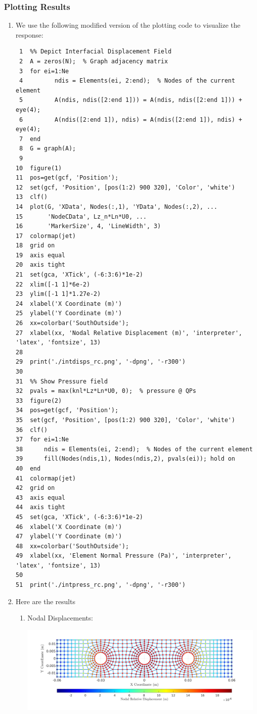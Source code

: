 \documentclass[11pt]{article}
\begin{document}
\subsubsection{Plotting Results}
\label{sec:org25cc1c0}
\begin{enumerate}
\item We use the following modified version of the plotting code to visualize the response:
\begin{verbatim}
 1  %% Depict Interfacial Displacement Field
 2  A = zeros(N);  % Graph adjacency matrix
 3  for ei=1:Ne
 4         ndis = Elements(ei, 2:end);  % Nodes of the current element
 5         A(ndis, ndis([2:end 1])) = A(ndis, ndis([2:end 1])) + eye(4);
 6         A(ndis([2:end 1]), ndis) = A(ndis([2:end 1]), ndis) + eye(4);
 7  end
 8  G = graph(A);
 9  
10  figure(1)
11  pos=get(gcf, 'Position');
12  set(gcf, 'Position', [pos(1:2) 900 320], 'Color', 'white')
13  clf()
14  plot(G, 'XData', Nodes(:,1), 'YData', Nodes(:,2), ...
15       'NodeCData', Lz_n*Ln*U0, ...
16       'MarkerSize', 4, 'LineWidth', 3)
17  colormap(jet)
18  grid on
19  axis equal
20  axis tight
21  set(gca, 'XTick', (-6:3:6)*1e-2)
22  xlim([-1 1]*6e-2)
23  ylim([-1 1]*1.27e-2)
24  xlabel('X Coordinate (m)')
25  ylabel('Y Coordinate (m)')
26  xx=colorbar('SouthOutside');
27  xlabel(xx, 'Nodal Relative Displacement (m)', 'interpreter', 'latex', 'fontsize', 13)
28  
29  print('./intdisps_rc.png', '-dpng', '-r300')
30  
31  %% Show Pressure field
32  pvals = max(knl*Lz*Ln*U0, 0);  % pressure @ QPs
33  figure(2)
34  pos=get(gcf, 'Position');
35  set(gcf, 'Position', [pos(1:2) 900 320], 'Color', 'white')
36  clf()
37  for ei=1:Ne
38      ndis = Elements(ei, 2:end);  % Nodes of the current element
39      fill(Nodes(ndis,1), Nodes(ndis,2), pvals(ei)); hold on
40  end
41  colormap(jet)
42  grid on
43  axis equal
44  axis tight
45  set(gca, 'XTick', (-6:3:6)*1e-2)
46  xlabel('X Coordinate (m)')
47  ylabel('Y Coordinate (m)')
48  xx=colorbar('SouthOutside');
49  xlabel(xx, 'Element Normal Pressure (Pa)', 'interpreter', 'latex', 'fontsize', 13)
50  
51  print('./intpress_rc.png', '-dpng', '-r300')
\end{verbatim}
\item Here are the results
\begin{enumerate}
\item Nodal Displacements:
\begin{center}
\includegraphics[width=\textwidth]{./figs/intdisps_rc.png}

\end{center}
\end{enumerate}
\end{enumerate}
\end{document}
